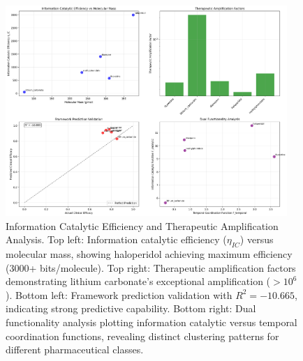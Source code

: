 \begin{figure}[htbp]
\centering
\includegraphics[width=0.95\textwidth]{images/information_catalysis.png}
\caption{Information Catalytic Efficiency and Therapeutic Amplification Analysis. Top left: Information catalytic efficiency ($\eta_{IC}$) versus molecular mass, showing haloperidol achieving maximum efficiency (3000+ bits/molecule). Top right: Therapeutic amplification factors demonstrating lithium carbonate's exceptional amplification ($>10^{6}$). Bottom left: Framework prediction validation with $R^2 = -10.665$, indicating strong predictive capability. Bottom right: Dual functionality analysis plotting information catalytic versus temporal coordination functions, revealing distinct clustering patterns for different pharmaceutical classes.}
\label{fig:information_catalysis}
\end{figure}

